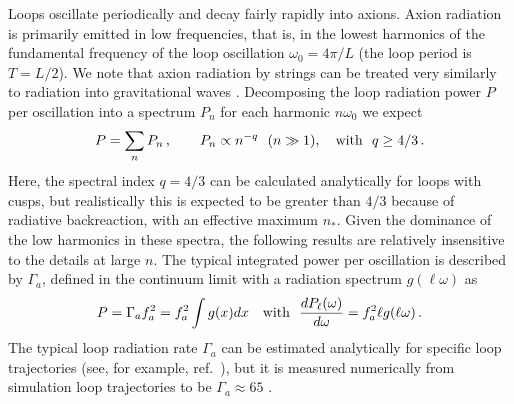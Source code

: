 \documentclass[preprint,nofootinbib]{revtex4}
\begin{document}
Loops oscillate periodically and decay fairly rapidly into axions. Axion radiation is primarily emitted in low frequencies, that is, in the lowest harmonics of the fundamental frequency of the loop oscillation $\omega_0 = 4\pi/L$ (the loop period is $T=L/2$). We note that axion radiation by strings can be treated very similarly to radiation into gravitational waves \cite{vilenkin:shellard:defects}. Decomposing the loop radiation power $P$ per oscillation into a spectrum $P_n$ for each harmonic $n\omega_0$ we expect
\begin{equation}
P = \sum_n P_n\,,\qquad P_n\propto n^{-q}~~(n\gg 1), \quad \hbox{with} ~~ q\ge 4/3\,.
\end{equation}
Here, the spectral index $q=4/3$ can be calculated analytically for loops with cusps, but realistically this is expected to be greater than $4/3$ because of radiative backreaction, with an effective maximum $n_*$. Given the dominance of the low harmonics in these spectra, the following results are relatively insensitive to the details at large $n$. The typical integrated power per oscillation is described by $\Gamma_a$, defined in the continuum limit with a radiation spectrum $g(\ell \omega)$ as
\begin{equation}
P = \Gamma_a f_a^2 = f_a^2 \int g(x) dx  \quad \hbox{with} ~~\frac{dP_\ell (\omega)}{d\omega} = f_a^2 \ell g(\ell\omega)\,. \label{eq:loopspectrum}
\end{equation}
The typical loop radiation rate $\Gamma_a$ can be estimated analytically for specific loop trajectories (see, for
example, ref.~\cite{Allen:1994bs}), but it is measured numerically from simulation loop trajectories to be $\Gamma_a \approx 65$ \cite{Allen:1991bk}.
\end{document}
